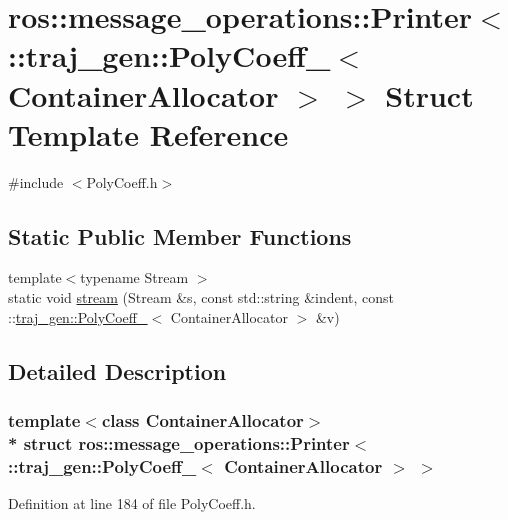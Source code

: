 \hypertarget{structros_1_1message__operations_1_1_printer_3_01_1_1traj__gen_1_1_poly_coeff___3_01_container_allocator_01_4_01_4}{}\section{ros\+:\+:message\+\_\+operations\+:\+:Printer$<$ \+:\+:traj\+\_\+gen\+:\+:Poly\+Coeff\+\_\+$<$ Container\+Allocator $>$ $>$ Struct Template Reference}
\label{structros_1_1message__operations_1_1_printer_3_01_1_1traj__gen_1_1_poly_coeff___3_01_container_allocator_01_4_01_4}


{\ttfamily \#include $<$Poly\+Coeff.\+h$>$}

\subsection*{Static Public Member Functions}
\begin{DoxyCompactItemize}
\item 
{\footnotesize template$<$typename Stream $>$ }\\static void \hyperlink{structros_1_1message__operations_1_1_printer_3_01_1_1traj__gen_1_1_poly_coeff___3_01_container_allocator_01_4_01_4_ae3d9a8af47ff35b27810a1136d8798ef}{stream} (Stream \&s, const std\+::string \&indent, const \+::\hyperlink{structtraj__gen_1_1_poly_coeff__}{traj\+\_\+gen\+::\+Poly\+Coeff\+\_\+}$<$ Container\+Allocator $>$ \&v)
\end{DoxyCompactItemize}


\subsection{Detailed Description}
\subsubsection*{template$<$class Container\+Allocator$>$\\*
struct ros\+::message\+\_\+operations\+::\+Printer$<$ \+::traj\+\_\+gen\+::\+Poly\+Coeff\+\_\+$<$ Container\+Allocator $>$ $>$}



Definition at line 184 of file Poly\+Coeff.\+h.



